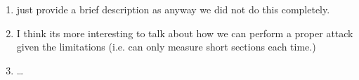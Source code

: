 \begin{enumerate}
  \item just provide a brief description as anyway we did not do this completely. 
  \item I think its more interesting to talk about how we can perform a proper attack given the limitations (i.e. can only measure short sections each time.)
  \item \ldots
\end{enumerate}

